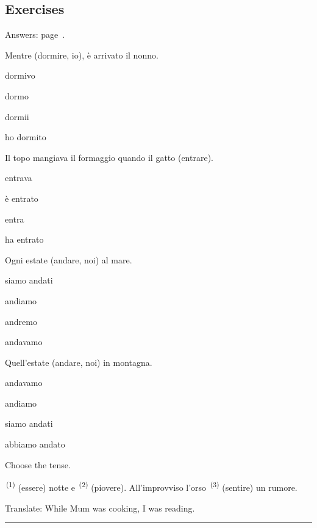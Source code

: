\documentclass[11pt,a4paper,twoside,openright]{book}
\newcommand{\blank}{\underline{\hspace{2.6cm}}}
\newcommand{\clozeblank}[1]{\underline{\hspace{2.4cm}}\textsuperscript{\,(#1)}}
\newcommand{\answerline}{\par\vspace{6pt}\noindent\rule{0.75\linewidth}{0.4pt}\par}
\begin{document}
\subsection*{Exercises}\label{les:imperfetto-passato:exercises}
{\color{muted}\small Answers: page~\pageref{ans:imperfetto-passato}.}

\begin{exercises}
\item\label{ex:imperfetto-passato-1}\relax Mentre \blank{} (dormire, io), è arrivato il nonno.\par\nopagebreak\begin{options}
\item\relax dormivo
\item\relax dormo
\item\relax dormii
\item\relax ho dormito
\end{options}
\item\label{ex:imperfetto-passato-2}\relax Il topo mangiava il formaggio quando il gatto \blank{} (entrare).\par\nopagebreak\begin{options}
\item\relax entrava
\item\relax è entrato
\item\relax entra
\item\relax ha entrato
\end{options}
\item\label{ex:imperfetto-passato-3}\relax Ogni estate \blank{} (andare, noi) al mare.\par\nopagebreak\begin{options}
\item\relax siamo andati
\item\relax andiamo
\item\relax andremo
\item\relax andavamo
\end{options}
\item\label{ex:imperfetto-passato-4}\relax Quell'estate \blank{} (andare, noi) in montagna.\par\nopagebreak\begin{options}
\item\relax andavamo
\item\relax andiamo
\item\relax siamo andati
\item\relax abbiamo andato
\end{options}
\item\label{ex:imperfetto-passato-5}\relax Choose the tense.\par\smallskip\begingroup\setlength{\parindent}{0pt}\clozeblank{1} (essere) notte e \clozeblank{2} (piovere). All'improvviso l'orso \clozeblank{3} (sentire) un rumore.\par\endgroup
\item\label{ex:imperfetto-passato-6}\relax Translate: While Mum was cooking, I was reading.\par\answerline
\end{exercises}
\end{document}

